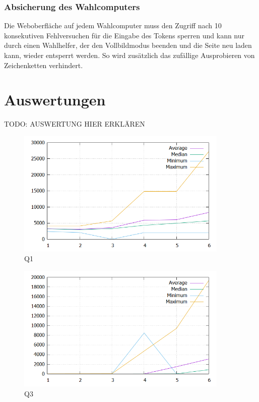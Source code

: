 \documentclass[a4paper]{scrreprt}
\begin{document}
\subsubsection{Absicherung des Wahlcomputers}

Die Weboberfläche auf jedem Wahlcomputer muss den Zugriff nach 10 konsekutiven Fehlversuchen für die Eingabe des Tokens sperren und kann nur durch einen Wahlhelfer, der den Vollbildmodus beenden und die Seite neu laden kann, wieder entsperrt werden.
So wird zusätzlich das zufällige Ausprobieren von Zeichenketten verhindert.

\section{Auswertungen}

TODO: AUSWERTUNG HIER ERKLÄREN

\begin{figure}[h]
\centering
\includegraphics[width=0.9\textwidth]{images/q1-plot.png}
\caption {Q1}
\end{figure}

\begin{figure}[h]
\centering
\includegraphics[width=0.9\textwidth]{images/q3-plot.png}
\caption {Q3}
\end{figure}
\end{document}
